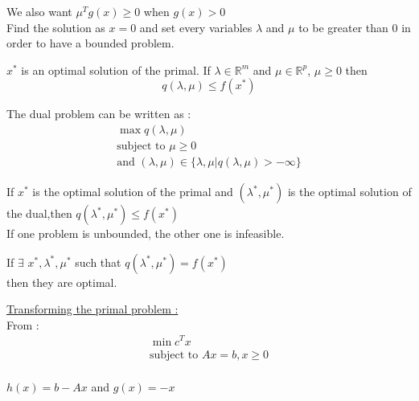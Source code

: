 \documentclass[../main.tex]{subfiles}
\begin{document}
We also want $\mu^Tg(x) \geq 0$ when $g(x)>0$\\

\warning Find the solution as $x=0$ and set every variables $\lambda$ and $\mu$ to be greater than 0 in order to have a bounded problem.\\


\begin{theoremen}
    $x^*$ is an optimal solution of the primal. If $\lambda \in \mathbb{R}^m$ and $\mu \in \mathbb{R}^p$, $\mu \geq 0$ then \begin{equation}
        q(\lambda, \mu) \leq f(x^*)
    \end{equation}
\end{theoremen}
The dual problem can be written as : \\
\begin{equation}
    \begin{gathered}
        \max q(\lambda, \mu)\\
        \text{subject to } \mu \geq 0\\
        \text{and } (\lambda,\mu)\in \{\lambda, \mu \lvert q(\lambda,\mu) > - \infty\}
    \end{gathered}
\end{equation}

If $x^*$ is the optimal solution of the primal and $(\lambda^*,\mu^*)$ is the optimal solution of the dual,then $q(\lambda^*,\mu^*)\leq f(x^*)$\\

\warning If one problem is unbounded, the other one is infeasible.\\

\begin{theoremen}
    If $\exists$ $x^*, \lambda^*, \mu^*$ such that $q(\lambda^*,\mu^*) = f(x^*)$\\
    then they are optimal.
\end{theoremen}

\quad \underline{Transforming the primal problem :}\\

From : \begin{equation}
    \begin{gathered}
        \min c^Tx\\
        \text{subject to } Ax=b, x\geq 0\\
    \end{gathered}
\end{equation}

$h(x) = b-Ax$ and $g(x) = -x$\\
\end{document}
